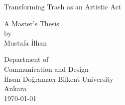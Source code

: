 \documentclass[12pt]{report}
\begin{document}
\begin{titlepage}
    \begin{center}
        
        \Huge
        Transforming Trash as an Artistic Act
        
        \vfill
        \Large
        A Master’s Thesis\\
        by\\
        Mustafa İlhan
        
        \vfill
        Department of\\
        Communication and Design\\
        İhsan Doğramacı Bilkent University\\
        Ankara\\
        \today
        
    \end{center}
\end{titlepage}

\end{document}
